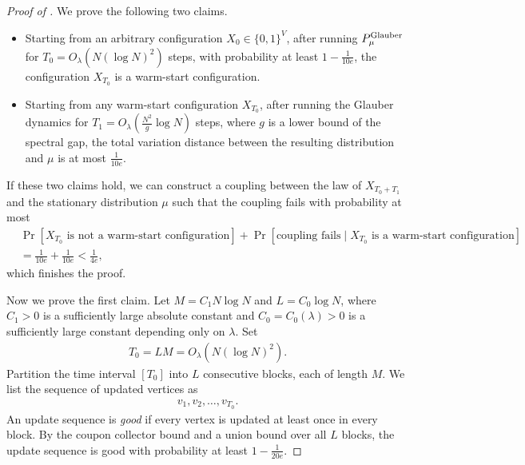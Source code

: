 \documentclass[11pt]{amsart}
\renewcommand{\Pr}{\mathop{\mathrm{Pr}}\nolimits}
\theoremstyle{definition}
\theoremstyle{remark}
\begin{document}
\begin{proof}[Proof of ]
We prove the following two claims.
\begin{itemize}
    \item Starting from an arbitrary configuration $X_0 \in \{0,1\}^{V}$, after running $P_{\mu}^{\textnormal{Glauber}}$ for $T_0 = O_\lambda(N (\log N)^2)$ steps, with probability at least $1 - \frac{1}{10e}$, the configuration $X_{T_0}$ is a warm-start configuration.
    \item Starting from any warm-start configuration $X_{T_0}$, after running the Glauber dynamics for $T_1 = O_\lambda\left(\frac{N^2}{g} \log N\right)$ steps, where $g$ is a lower bound of the spectral gap, the total variation distance between the resulting distribution and $\mu$ is at most $\frac{1}{10e}$.
\end{itemize}
If these two claims hold, we can construct a coupling between the law of $X_{T_0 + T_1}$ and the stationary distribution $\mu$ such that the coupling fails with probability at most
\begin{align*}
&\Pr[X_{T_0} \text{ is not a warm-start configuration}] + \Pr[\text{coupling fails} \mid X_{T_0} \text{ is a warm-start configuration}] \\
&= \frac{1}{10e} + \frac{1}{10e} < \frac{1}{4e},
\end{align*}
which finishes the proof.

Now we prove the first claim. Let $M = C_1 N \log N$ and $L = C_0 \log N$, where $C_1 > 0$ is a sufficiently large absolute constant and $C_0 = C_0(\lambda) > 0$ is a sufficiently large constant depending only on $\lambda$. Set
\begin{align*}
T_0 = LM = O_\lambda(N(\log N)^2).
\end{align*}
Partition the time interval $[T_0]$ into $L$ consecutive blocks, each of length $M$.
We list the sequence of updated vertices as
\begin{align*}
  v_1,v_2,\ldots,v_{T_0}.
\end{align*}
An update sequence is \emph{good} if every vertex is updated at least once in every block.
By the coupon collector bound and a union bound over all $L$ blocks, the update sequence is good with probability at least $1 - \frac{1}{20e}$.


\end{proof}
\end{document}
